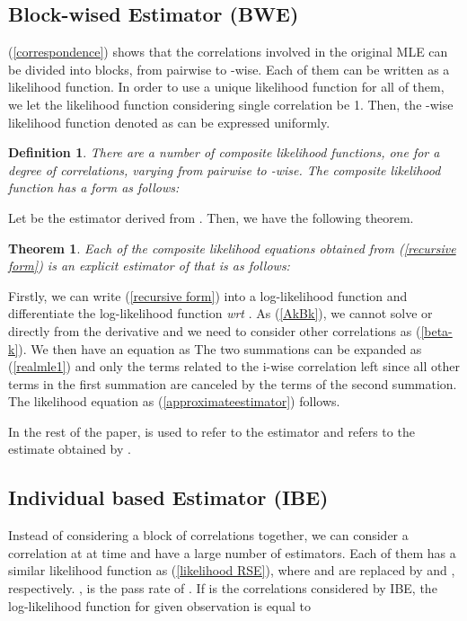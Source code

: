 \documentclass[10pt,onecolumn]{IEEEtran}
\newtheorem{definition}{\bf Definition}
\newtheorem{theorem}{\bf Theorem}
\begin{document}
\subsection{Block-wised Estimator (BWE)}


(\ref{correspondence}) shows that the correlations involved in the original MLE can be divided into  blocks, from pairwise to -wise.  Each of them can be written as a likelihood function. In order to use a unique likelihood function for all of them, we let the likelihood function considering single correlation be 1. Then, the -wise likelihood function denoted as  can be expressed uniformly.



\begin{definition} \label{recursive corollary}
There are a number of composite likelihood functions, one for a degree of correlations, varying from pairwise to -wise. The composite likelihood function   has a  form as follows:


 \end{definition}
 Let  be the estimator derived from . Then,  we have the following theorem.
\begin{theorem} \label{all explicit}
Each of the composite likelihood
equations obtained from (\ref{recursive form}) is an explicit estimator of  that is as follows:

\end{theorem}
\begin{IEEEproof}
Firstly, we can write (\ref{recursive form}) into a log-likelihood function and differentiate the log-likelihood function {\it wrt} . As (\ref{AkBk}), we cannot solve  or  directly from the derivative and we need to consider other correlations as (\ref{beta-k}). We then have an equation as
 The two summations can be expanded as (\ref{realmle1}) and only the terms related to the i-wise correlation left  since all other terms in the first summation are canceled by the terms of the second summation. The likelihood equation as (\ref{approximateestimator}) follows.
\end{IEEEproof}
In the rest of the paper,  is used to refer to the  estimator and  refers to the estimate obtained by .


\subsection{Individual based Estimator (IBE)}

Instead of considering a block of correlations together, we can consider a correlation at at time and have a large number of estimators. Each of them has a similar likelihood function as (\ref{likelihood RSE}), where  and  are replaced by  and , respectively. , is the pass rate of . If  is the correlations considered by IBE, the log-likelihood function for  given observation  is equal to
 
\end{document}

